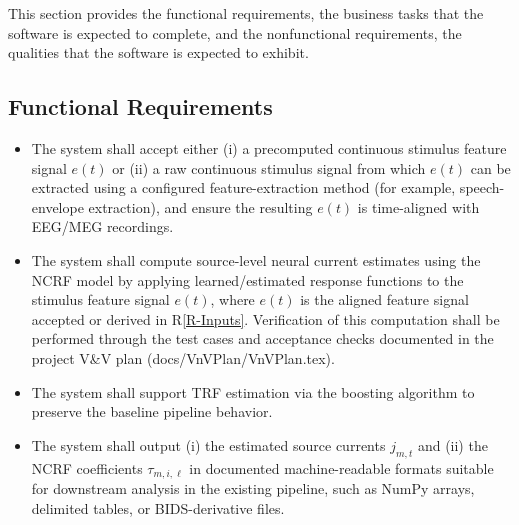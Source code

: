 \documentclass[12pt]{article}
\newcounter{reqnum} %
\newcommand{\rref}[1]{R\ref{#1}}
\begin{document}
This section provides the functional requirements, the business tasks that the
software is expected to complete, and the nonfunctional requirements, the
qualities that the software is expected to exhibit.

\subsection{Functional Requirements}

\noindent
\begin{itemize}

  \item[R\refstepcounter{reqnum}\thereqnum \label{R-Inputs}:]
    The system shall accept either (i) a precomputed continuous stimulus feature signal $e(t)$ or (ii) a raw continuous stimulus signal from which $e(t)$ can be extracted using a configured feature-extraction method (for example, speech-envelope extraction), and ensure the resulting $e(t)$ is time-aligned with EEG/MEG recordings.

  \item[R\refstepcounter{reqnum}\thereqnum \label{R-Calculate}:]
    The system shall compute source-level neural current estimates using the NCRF model by applying learned/estimated response functions to the stimulus feature signal $e(t)$, where $e(t)$ is the aligned feature signal accepted or derived in \rref{R-Inputs}. Verification of this computation shall be performed through the test cases and acceptance checks documented in the project V\&V plan (docs/VnVPlan/VnVPlan.tex).

  \item[R\refstepcounter{reqnum}\thereqnum \label{R-Calculate-Boosting}:]
    The system shall support TRF estimation via the boosting algorithm to preserve the baseline pipeline behavior.


  \item[R\refstepcounter{reqnum}\thereqnum \label{R-Output}:]
    The system shall output (i) the estimated source currents $j_{m,t}$ and (ii) the NCRF coefficients $\tau_{m,i,\ell}$ in documented machine-readable formats suitable for downstream analysis in the existing pipeline, such as NumPy arrays, delimited tables, or BIDS-derivative files.

\end{itemize}
\end{document}
